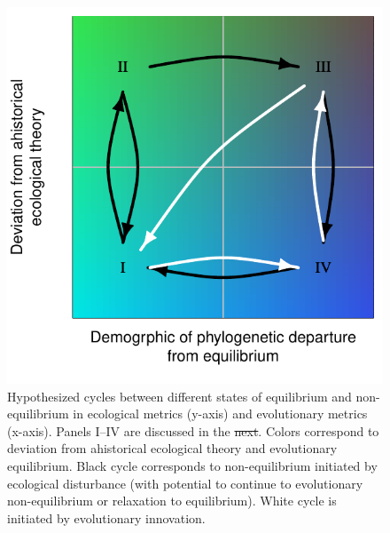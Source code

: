 \documentclass[12pt]{article}
\providecommand{\DIFaddtex}[1]{{\protect\color{blue}\uwave{#1}}} %
\providecommand{\DIFdeltex}[1]{{\protect\color{red}\sout{#1}}}                      %
\providecommand{\DIFdelbegin}{} %
\providecommand{\DIFaddFL}[1]{\DIFadd{#1}} %
\providecommand{\DIFdelFL}[1]{\DIFdel{#1}} %
\providecommand{\DIFaddbeginFL}{} %
\providecommand{\DIFaddendFL}{} %
\providecommand{\DIFdelbeginFL}{} %
\providecommand{\DIFdelendFL}{} %
\providecommand{\DIFadd}[1]{\texorpdfstring{\DIFaddtex{#1}}{#1}} %
\providecommand{\DIFdel}[1]{\texorpdfstring{\DIFdeltex{#1}}{}} %
\begin{document}
\begin{figure}[!hbp]
  \centering
  \includegraphics[scale=1]{fig_cycles.pdf}
  \caption{Hypothesized cycles between different states of equilibrium
    and non-equilibrium in ecological metrics (y-axis) and
    evolutionary metrics (x-axis). Panels I--IV are discussed in the
    \DIFdelbeginFL \DIFdelFL{next}\DIFdelendFL \DIFaddbeginFL \DIFaddFL{text}\DIFaddendFL .  Colors correspond to deviation from ahistorical ecological
    theory and evolutionary equilibrium.  Black cycle corresponds to
    non-equilibrium initiated by ecological disturbance (with
    potential to continue to evolutionary non-equilibrium or
    relaxation to equilibrium). White cycle is initiated by
    evolutionary innovation.}
  \label{fig:cycles}
\end{figure}
\DIFdelbegin %
\end{document}
